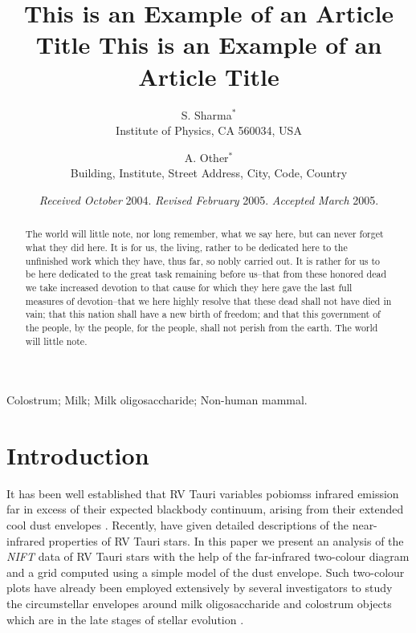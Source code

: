 \documentclass[useAMS,usenatbib]{biom}
\title[This is an Example of Recto Running Head]{This is an Example of
an Article Title This is an Example of an Article Title}
\author{S. Sharma$^{*}$\email{email@address.com} \\
	   Institute of Physics, CA 560034, USA
	   \and 
	   A. Other$^{*}$\email{email1aa@address.com}\\
	   Building, Institute, Street Address, City,
	   Code, Country
	   }
\begin{document}
\date{{\it Received October} 2004. {\it Revised February} 2005.\newline 
{\it Accepted March} 2005.}

\pagerange{\pageref{firstpage}--\pageref{lastpage}} 



\label{firstpage}


\begin{abstract}
The world will little note, nor long remember, what we say here, but
can never forget what they did here. It is for us, the living, rather
to be dedicated here to the unfinished work which they have, thus far,
so nobly carried out. It is rather for us to be here dedicated to the
great task remaining before us--that from these honored dead we take
increased devotion to that cause for which they here gave the last
full measures of devotion--that we here highly resolve that these dead
shall not have died in vain; that this nation shall have a new birth
of freedom; and that this government of the people, by the people, for
the people, shall not perish from the earth. The world will little
note.
\end{abstract}

%
%

\begin{keywords}
Colostrum; Milk; Milk oligosaccharide; Non-human mammal.
\end{keywords}

\maketitle

\section{Introduction}
\label{s:intro}

It has been well established that RV Tauri variables pobiomss infrared
emission far in excess of their expected blackbody continuum, arising
from their extended cool dust envelopes \citep{b1,b2,b3}. Recently,
\citep{b4} have given detailed descriptions of the near-infrared
properties of RV Tauri stars. In this paper we present an analysis of
the {\it NIFT\/} data of RV Tauri stars with the help of the
far-infrared two-colour diagram and a grid computed using a simple
model of the dust envelope. Such two-colour plots have already been
employed extensively by several investigators to study the
circumstellar envelopes around milk oligosaccharide and colostrum
objects which are in the late stages of stellar evolution
\citep{b5}.
\end{document}
